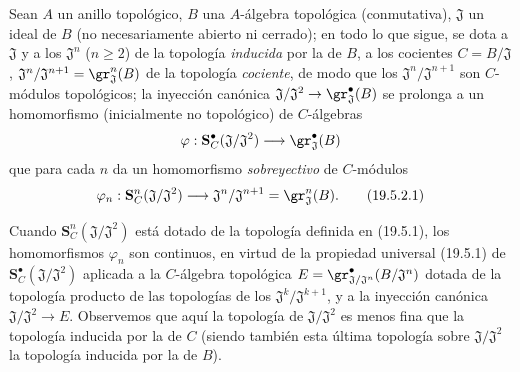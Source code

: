 \begin{env}[19.5.2]
\label{0.19.5.2-fr}
Sean $A$ un anillo topológico, $B$ una $A$-álgebra topológica
(conmutativa), $\mathfrak J$ un ideal de $B$ (no necesariamente abierto ni
cerrado); en todo lo que sigue, se dota a $\mathfrak J$ y a los
$\mathfrak J^n$ ($n\geq2$) de la topología \emph{inducida} por la de $B$,
a los cocientes $C=B/\mathfrak J$,
$\mathfrak J^n/\mathfrak J^{n+1}=\gr_{\mathfrak J}^n(B)$ de la topología
\emph{cociente}, de modo que los $\mathfrak J^n/\mathfrak J^{n+1}$ son
$C$-módulos topológicos; la inyección canónica
$\mathfrak J/\mathfrak J^2\to\gr_{\mathfrak J}^\bullet(B)$ se prolonga a un
homomorfismo (inicialmente no topológico) de $C$-álgebras
\[
  \varphi:\mathbf S_C^\bullet(\mathfrak J/\mathfrak J^2)
  \longrightarrow\gr_{\mathfrak J}^\bullet(B)
\]
que para cada $n$ da un homomorfismo \emph{sobreyectivo} de $C$-módulos
\begin{equation}
\label{0.19.5.2.1-fr}
  \varphi_n:\mathbf S_C^n(\mathfrak J/\mathfrak J^2)
  \longrightarrow\mathfrak J^n/\mathfrak J^{n+1}
  =\gr_{\mathfrak J}^n(B).
  \tag{19.5.2.1}
\end{equation}



Cuando $\mathbf S_C^n(\mathfrak J/\mathfrak J^2)$ está dotado de la topología
definida en (19.5.1), los homomorfismos $\varphi_n$ son continuos, en virtud
de la propiedad universal (19.5.1) de
$\mathbf S_C^\bullet(\mathfrak J/\mathfrak J^2)$
 aplicada a la $C$-álgebra
topológica $E=\gr^\bullet_{\mathfrak J/\mathfrak J^n}(B/\mathfrak J^n)$ dotada de la
topología producto de las topologías de los $\mathfrak J^k/\mathfrak J^{k+1}$, y a
la inyección canónica $\mathfrak J/\mathfrak J^2\to E$. Observemos que aquí la
topología de $\mathfrak J/\mathfrak J^2$ es menos fina que la topología
inducida por la de $C$ (siendo también esta última topología sobre
$\mathfrak J/\mathfrak J^2$ la topología inducida por la de $B$).
\end{env}

